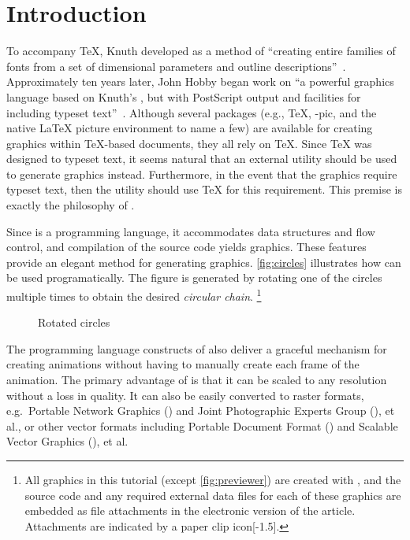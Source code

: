 \section{Introduction}
\label{sec:introduction}

To accompany \TeX{}, Knuth developed \MF{} as a method of ``creating
entire families of fonts from a set of dimensional parameters and
outline descriptions''~\cite{beebe:mf}.  Approximately ten years later,
John Hobby began work on \MP{}\Dash ``a powerful graphics language based
on Knuth's \MF, but with PostScript output and facilities for including
typeset text''~\cite{hobby:user}.  Although several packages (e.g.,
\PiC\TeX, \Xy-pic, and the native \LaTeX{} picture environment to name a
few) are available for creating graphics within \TeX-based documents,
they all rely on \TeX{}.  Since \TeX{} was designed to typeset text, it
seems natural that an external utility should be used to generate
graphics instead.  Furthermore, in the event that the graphics require
typeset text, then the utility should use \TeX{} for this requirement.
This premise is exactly the philosophy of \MP.

Since \MP{} is a programming language, it accommodates data structures
and flow control, and compilation of the \MP{} source code yields \EPS{}
graphics.  These features provide an elegant method for generating
graphics.  \autoref{fig:circles} illustrates how \MP{} can be used
programatically.  The figure is generated by rotating one of the circles
multiple times to obtain the desired \textit{circular chain}.%
\footnote{All graphics in this tutorial (except \autoref{fig:previewer})
  are created with \MP{}, and the source code and any required external
  data files for each of these graphics are embedded as file attachments
  in the electronic \PDF{} version of the article.  Attachments are
  indicated by a paper clip
  icon\marginnote{\raggedleft\notextattachfile{\paperclip}}[-1.5\baselineskip].}

\begin{figure}
  \centering
  \caption{Rotated circles}
  \label{fig:circles}
\end{figure}

The programming language constructs of \MP{} also deliver a graceful
mechanism for creating animations without having to manually create each
frame of the animation.  The primary advantage of \EPS{} is that it can
be scaled to any resolution without a loss in quality.  It can also be
easily converted to raster formats, e.g.\ Portable Network Graphics
(\PNG) and Joint Photographic Experts Group (\JPEG), et al., or other
vector formats including Portable Document Format (\PDF) and Scalable
Vector Graphics (\SVG), et al.

